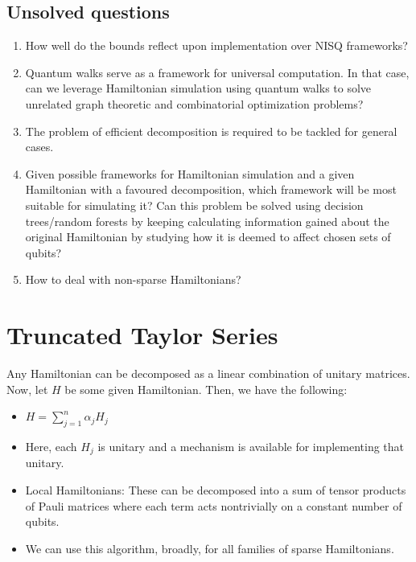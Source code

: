 \documentclass[
10pt, %
a4paper, %
oneside, %
headinclude,footinclude, %
BCOR5mm, %
]{scrartcl}
\begin{document}
\subsection{Unsolved questions}
\begin{enumerate}
    \item How well do the bounds reflect upon implementation over NISQ frameworks?
    \item Quantum walks serve as a framework for universal computation. In that case, can we leverage Hamiltonian simulation using quantum walks to solve unrelated graph theoretic and combinatorial optimization problems?
    \item The problem of efficient decomposition is required to be tackled for general cases.
    \item Given possible frameworks for Hamiltonian simulation and a given Hamiltonian with a favoured decomposition, which framework will be most suitable for simulating it? Can this problem be solved using decision trees/random forests by keeping calculating information gained about the original Hamiltonian by studying how it is deemed to affect chosen sets of qubits?
    \item How to deal with non-sparse Hamiltonians?
\end{enumerate}

\section{Truncated Taylor Series}
Any Hamiltonian can be decomposed as a linear combination of unitary matrices. Now, let $H$ be some given Hamiltonian. Then, we have the following:
\begin{itemize}
    \item $H = \sum_{j = 1}^n \alpha_j H_j$
    \item Here, each $H_j$ is unitary and a mechanism is available for implementing that unitary.
    \item Local Hamiltonians: These can be decomposed into a sum of tensor products of Pauli matrices where each term acts nontrivially on a constant number of qubits.
    \item We can use this algorithm, broadly, for all families of sparse Hamiltonians.
\end{itemize}
\end{document}
